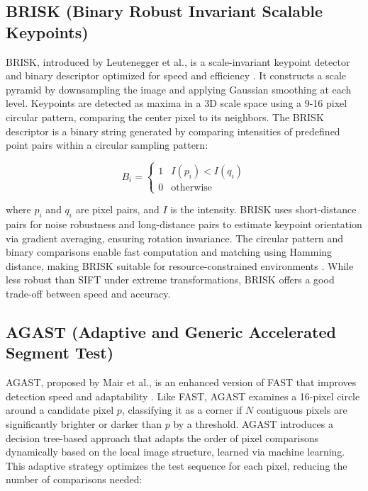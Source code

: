 \documentclass[journal]{IEEEtran}
\begin{document}
\subsection{BRISK (Binary Robust Invariant Scalable Keypoints)}
BRISK, introduced by Leutenegger et al., is a scale-invariant keypoint detector and binary descriptor optimized for speed and efficiency \cite{BRISK}. It constructs a scale pyramid by downsampling the image and applying Gaussian smoothing at each level. Keypoints are detected as maxima in a 3D scale space using a 9-16 pixel circular pattern, comparing the center pixel to its neighbors. The BRISK descriptor is a binary string generated by comparing intensities of predefined point pairs within a circular sampling pattern:

\begin{equation}
B_i = \begin{cases} 1 & I(p_i) < I(q_i) \\ 0 & \text{otherwise} \end{cases}
\end{equation}

where \( p_i \) and \( q_i \) are pixel pairs, and \( I \) is the intensity. BRISK uses short-distance pairs for noise robustness and long-distance pairs to estimate keypoint orientation via gradient averaging, ensuring rotation invariance. The circular pattern and binary comparisons enable fast computation and matching using Hamming distance, making BRISK suitable for resource-constrained environments \cite{BRISK}. While less robust than SIFT under extreme transformations, BRISK offers a good trade-off between speed and accuracy.\\

\subsection{AGAST (Adaptive and Generic Accelerated Segment Test)}
AGAST, proposed by Mair et al., is an enhanced version of FAST that improves detection speed and adaptability \cite{AGAST}. Like FAST, AGAST examines a 16-pixel circle around a candidate pixel \( p \), classifying it as a corner if \( N \) contiguous pixels are significantly brighter or darker than \( p \) by a threshold. AGAST introduces a decision tree-based approach that adapts the order of pixel comparisons dynamically based on the local image structure, learned via machine learning. This adaptive strategy optimizes the test sequence for each pixel, reducing the number of comparisons needed:
\end{document}
